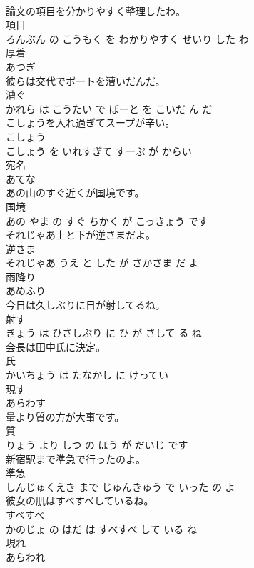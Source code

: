 \documentclass[8pt]{extreport}
\begin{document}
\begin{CJK}{UTF8}{min}
\\	論文の項目を分かりやすく整理したわ。	
\\	項目 
\\	ろんぶん の こうもく を わかりやすく せいり した わ			
\\	厚着	
\\	あつぎ		
\\	彼らは交代でボートを漕いだんだ。	
\\	漕ぐ 
\\	かれら は こうたい で ぼーと を こいだ ん だ			
\\	こしょうを入れ過ぎてスープが辛い。	
\\	こしょう 
\\	こしょう を いれすぎて すーぷ が からい			
\\	宛名	
\\	あてな		
\\	あの山のすぐ近くが国境です。	
\\	国境 
\\	あの やま の すぐ ちかく が こっきょう です			
\\	それじゃあ上と下が逆さまだよ。	
\\	逆さま 
\\	それじゃあ うえ と した が さかさま だ よ			
\\	雨降り	
\\	あめふり		
\\	今日は久しぶりに日が射してるね。	
\\	射す 
\\	きょう は ひさしぶり に ひ が さして る ね			
\\	会長は田中氏に決定。	
\\	氏 
\\	かいちょう は たなかし に けってい			
\\	現す	
\\	あらわす		
\\	量より質の方が大事です。	
\\	質 
\\	りょう より しつ の ほう が だいじ です			
\\	新宿駅まで準急で行ったのよ。	
\\	準急 
\\	しんじゅくえき まで じゅんきゅう で いった の よ			
\\	彼女の肌はすべすべしているね。	
\\	すべすべ 
\\	かのじょ の はだ は すべすべ して いる ね			
\\	現れ	
\\	あらわれ		

\end{CJK}
\end{document}
